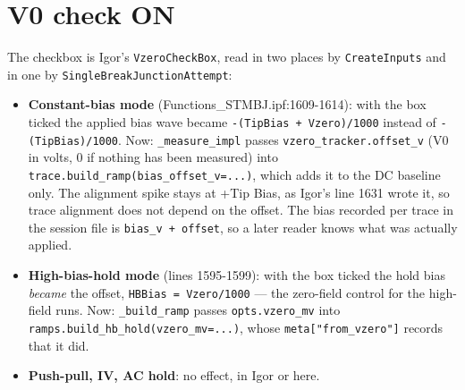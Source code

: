 \section{V0 check ON}

The checkbox is Igor's \texttt{Vzero\discretionary{}{}{}Check\discretionary{}{}{}Box}, read in two places by \texttt{Create\discretionary{}{}{}Inputs} and in one by \texttt{Single\discretionary{}{}{}Break\discretionary{}{}{}Junction\discretionary{}{}{}Attempt}:

\begin{itemize}[leftmargin=*]
\item \textbf{Constant-bias mode} (Functions\_STMBJ.ipf:1609-1614): with the box ticked the applied bias wave became \texttt{-(Tip\discretionary{}{}{}Bias + Vzero)/\discretionary{}{}{}1000} instead of \texttt{-(Tip\discretionary{}{}{}Bias)/\discretionary{}{}{}1000}. Now: \texttt{\_\discretionary{}{}{}measure\_\discretionary{}{}{}impl} passes \texttt{vzero\_\discretionary{}{}{}tracker.\discretionary{}{}{}offset\_\discretionary{}{}{}v} (V0 in volts, 0 if nothing has been measured) into \texttt{trace.\discretionary{}{}{}build\_\discretionary{}{}{}ramp(bias\_\discretionary{}{}{}offset\_\discretionary{}{}{}v=.\discretionary{}{}{}.\discretionary{}{}{}.\discretionary{}{}{})}, which adds it to the DC baseline only. The alignment spike stays at +Tip Bias, as Igor's line 1631 wrote it, so trace alignment does not depend on the offset. The bias recorded per trace in the session file is \texttt{bias\_\discretionary{}{}{}v + offset}, so a later reader knows what was actually applied.
\item \textbf{High-bias-hold mode} (lines 1595-1599): with the box ticked the hold bias \emph{became} the offset, \texttt{HBBias = Vzero/\discretionary{}{}{}1000} --- the zero-field control for the high-field runs. Now: \texttt{\_\discretionary{}{}{}build\_\discretionary{}{}{}ramp} passes \texttt{opts.\discretionary{}{}{}vzero\_\discretionary{}{}{}mv} into \texttt{ramps.\discretionary{}{}{}build\_\discretionary{}{}{}hb\_\discretionary{}{}{}hold(vzero\_\discretionary{}{}{}mv=.\discretionary{}{}{}.\discretionary{}{}{}.\discretionary{}{}{})}, whose \texttt{meta["from\_\discretionary{}{}{}vzero"]} records that it did.
\item \textbf{Push-pull, IV, AC hold}: no effect, in Igor or here.

\end{itemize}

